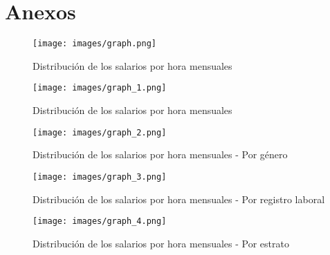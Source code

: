 \documentclass[11pt,oneside]{article}
\begin{document}
	\newpage
	\appendix
	\setcounter{table}{0}
	\renewcommand{\tablename}{Cuadro}
	\renewcommand{\figurename}{Figura}
	\renewcommand{\thetable}{A\arabic{table}}
	\setcounter{figure}{0}
	\renewcommand{\thefigure}{A\arabic{figure}}

\section{Anexos}

\begin{figure}[H]
    \centering
    \caption{Distribución de los salarios por hora mensuales}
    \label{fig:graph}
        \texttt{[image: images/graph.png]} \\
\end{figure}


\begin{figure}[H]
    \centering
    \caption{Distribución de los salarios por hora mensuales}
    \label{fig:graph_1}
        \texttt{[image: images/graph\_1.png]} \\
\end{figure}


\begin{figure}[H]
    \centering
    \caption{Distribución de los salarios por hora mensuales - Por género}
    \label{fig:graph_2}
        \texttt{[image: images/graph\_2.png]} \\
\end{figure}



\begin{figure}[H]
    \centering
    \caption{Distribución de los salarios por hora mensuales - Por registro laboral}
    \label{fig:graph_3}
        \texttt{[image: images/graph\_3.png]} \\
\end{figure}


\begin{figure}[H]
    \centering
    \caption{Distribución de los salarios por hora mensuales - Por estrato}
    \label{fig:graph_4}
        \texttt{[image: images/graph\_4.png]} \\
\end{figure}
\end{document}
